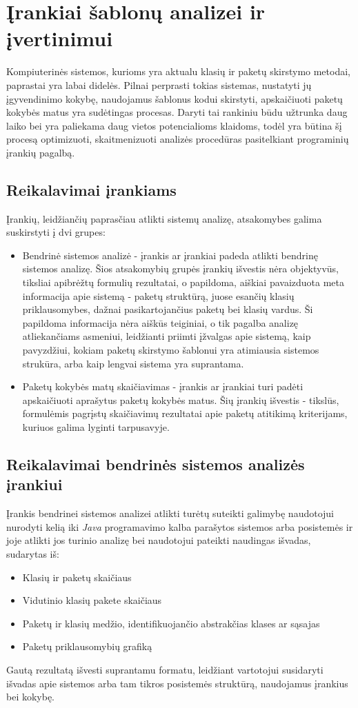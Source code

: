 \section{Įrankiai šablonų analizei ir įvertinimui}
Kompiuterinės sistemos, kurioms yra aktualu klasių ir paketų skirstymo metodai, paprastai yra labai didelės.
Pilnai perprasti tokias sistemas, nustatyti jų įgyvendinimo kokybę, naudojamus šablonus kodui skirstyti,
apskaičiuoti paketų kokybės matus yra sudėtingas procesas.
Daryti tai rankiniu būdu užtrunka daug laiko bei yra paliekama daug vietos potencialioms klaidoms,
todėl yra būtina šį procesą optimizuoti, skaitmenizuoti analizės procedūras pasitelkiant
 programinių įrankių pagalbą.

\subsection{Reikalavimai įrankiams}
Įrankių, leidžiančių paprasčiau atlikti sistemų analizę, atsakomybes galima suskirstyti į dvi grupes:
\begin{itemize}
    \item Bendrinė sistemos analizė - įrankis ar įrankiai padeda atlikti bendrinę sistemos analizę.
    Šios atsakomybių grupės įrankių išvestis nėra objektyvūs, tiksliai apibrėžtų formulių rezultatai, o papildoma, aiškiai
    pavaizduota meta informacija apie sistemą - paketų struktūrą, juose esančių klasių priklausomybes, dažnai pasikartojančius paketų bei klasių vardus.
    Ši papildoma informacija nėra aiškūs teiginiai, o tik pagalba analizę atliekančiams asmeniui, leidžianti priimti įžvalgas apie sistemą,
    kaip pavyzdžiui, kokiam paketų skirstymo šablonui yra atimiausia sistemos strukūra, arba kaip lengvai sistema yra suprantama.
    \item Paketų kokybės matų skaičiavimas - įrankis ar įrankiai turi padėti apskaičiuoti aprašytus paketų kokybės matus.
    Šių įrankių išvestis - tikslūs, formulėmis pagrįstų skaičiavimų rezultatai apie paketų atitikimą kriterijams, kuriuos galima lyginti tarpusavyje.
\end{itemize}

\subsection{Reikalavimai bendrinės sistemos analizės įrankiui}
Įrankis bendrinei sistemos analizei atlikti turėtų suteikti galimybę naudotojui nurodyti kelią iki \textit{Java} programavimo kalba parašytos sistemos arba posistemės ir joje
atlikti jos turinio analizę bei naudotojui pateikti naudingas išvadas, sudarytas iš:
\begin{itemize}
    \item Klasių ir paketų skaičiaus
    \item Vidutinio klasių pakete skaičiaus
    \item Paketų ir klasių medžio, identifikuojančio abstrakčias klases ar sąsajas
    \item Paketų priklausomybių grafiką
\end{itemize}
Gautą rezultatą išvesti suprantamu formatu, leidžiant vartotojui susidaryti išvadas apie sistemos arba tam tikros
posistemės struktūrą, naudojamus įrankius bei kokybę.

